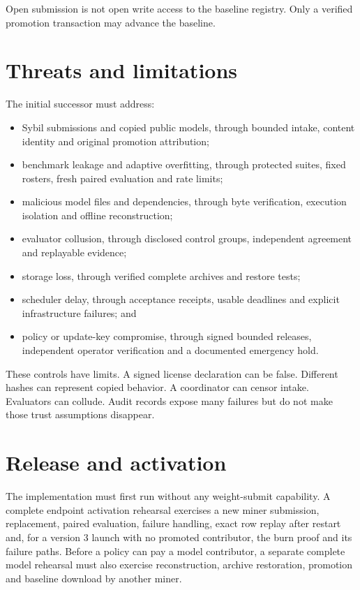 Open submission is not open write access to the baseline registry.
Only a verified promotion transaction may advance the baseline.

\section{Threats and limitations}\label{9-threats-and-limitations}

The initial successor must address:

\begin{itemize}
\tightlist
\item
  Sybil submissions and copied public models, through bounded intake,
  content identity and original promotion attribution;
\item
  benchmark leakage and adaptive overfitting, through protected suites,
  fixed rosters, fresh paired evaluation and rate limits;
\item
  malicious model files and dependencies, through byte verification,
  execution isolation and offline reconstruction;
\item
  evaluator collusion, through disclosed control groups, independent
  agreement and replayable evidence;
\item
  storage loss, through verified complete archives and restore tests;
\item
  scheduler delay, through acceptance receipts, usable deadlines and
  explicit infrastructure failures; and
\item
  policy or update-key compromise, through signed bounded releases,
  independent operator verification and a documented emergency hold.
\end{itemize}

These controls have limits. A signed license declaration can be false.
Different hashes can represent copied behavior. A coordinator can censor
intake. Evaluators can collude. Audit records expose many failures but do
not make those trust assumptions disappear.

\section{Release and activation}\label{10-release-and-activation}

The implementation must first run without any weight-submit capability.
A complete endpoint activation rehearsal exercises a new miner submission,
replacement, paired evaluation, failure handling, exact row replay after restart
and, for a version 3 launch with no promoted contributor, the burn proof and its
failure paths. Before a policy can pay a model contributor, a separate complete
model rehearsal must also exercise reconstruction, archive restoration,
promotion and baseline download by another miner.

